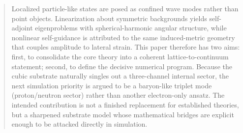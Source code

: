 \begin{abstract}
Localized particle-like states are posed as confined wave modes rather than point objects.
Linearization about symmetric backgrounds yields self-adjoint eigenproblems with spherical-harmonic angular structure,
while nonlinear self-guidance is attributed to the same induced-metric geometry that couples amplitude to lateral strain.
This paper therefore has two aims: first, to consolidate the core theory into a coherent lattice-to-continuum statement;
second, to define the decisive numerical program.
Because the cubic substrate naturally singles out a three-channel internal sector, the next simulation priority is argued
to be a baryon-like triplet mode (proton/neutron sector) rather than another electron-only ansatz.
The intended contribution is not a finished replacement for established theories, but a sharpened substrate model whose
mathematical bridges are explicit enough to be attacked directly in simulation.
\end{abstract}
